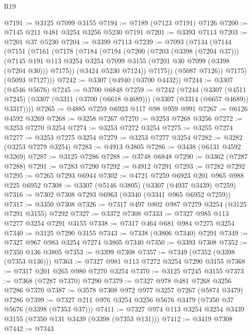 \begin{lexlean}{R19}
\begin{coremodule}
@7191 := @3125 @7099 @3155
@7194 := @7189 (@7123 @7191) @7126
@7200 := @7145 @211 @481 @3254 @3256 @5230 @7191
@7201 := @3393 @7113
@7203 := @7201 @37 @5230
@7204 := @3399 @7113
@7239 := @7093
    (@7134
      (@7144
        (@7151
          (@7161
            (@7178
              (@7184
                (@7194
                  (@7200
                    (@7203 (@3398 (@7204 @37)))
                    (@7145
                      @191
                      @113
                      @3254
                      @3254
                      @7099
                      @3155
                      (@7201 @30 @7099 (@3398 (@7204 @30)))
                      @7175))
                  (@3424 @5230 @7124))
                @7175))
            (@5087 @7126))
          @7175)
        (@5093 @7127)))
@7242 := @3307 (@4940 (@3700 @4432))
@7244 := @3307 (@4546 @5676)
@7245 := @3700 @6848
@7259 := @7242
    (@7244
      (@3307
        (@4511 @7245)
        (@3307 (@3311 (@3700 (@6618 @4689))) (@3307 (@3314 (@6657 @4689)) @3317))))
@7265 := @4885 @7259 @6923 @117 @98 @959 @991
@7267 := @6126 @4592 @3269
@7268 := @3258 @7267
@7270 := @3253 @7268 @3256
@7272 := @3253 @7270 @3254
@7274 := @3253 @7272 @3254
@7275 := @3255 @7274
@7277 := @3253 @7275 @3254
@7279 := @3253 @7277 @3254
@7282 := @3282 (@3253 @7279 @3254)
@7283 := @4913 @3805
@7286 := @3438 (@6131 @4592 @3269)
@7287 := @3125 @7286
@7288 := @3748 @6848
@7290 := @3362 (@7287 @7288)
@7291 := @7283 @7290
@7292 := @4912 @7291
@7293 := @7282 @7292
@7295 := @7265 @7293 @6944
@7302 := @4721 @7259 @6923 @201 @965 @988 @225 @6952
@7308 := @3307 (@5146 @3805) (@3307 (@4937 @3439) @7259)
@7316 := @7302 @7308 @7293 @6963 (@3340 (@3341 @965 @6952 @7259))
@7317 := @3350 @7308
@7326 := @7317 @497 @802 @987 @7279 @3254 (@3125 @7291 @3155) @7292
@7327 := @3372 @7308
@7333 := @7327 @985 @113 @7277 @3254 @7291 @3155
@7338 := @7317 @464 @681 @984 @7275 @3254
@7340 := @3125 @7290 @3155
@7343 := @7338 (@3806 @7340) @7291
@7349 := @7327 @967 @983 @3254 @7274 @3805 @7340
@7350 := @3393 @7308
@7352 := @7350 @136 @3805
@7353 := @3399 @7308
@7357 := @7349 (@7352 (@3398 (@7353 @136)))
@7363 := @7327 @981 @113 @7272 @3254 @7290 @3155
@7368 := @7317 @201 @265 @980 @7270 @3254
@7370 := @3125 @7245 @3155
@7373 := @7368 (@7287 @7370) @7290
@7379 := @7327 @978 @481 @7268 @3256 @7286 @7370
@7387 := @3578 @7308 @972 @977 @3257 @7267 (@5874 @3479) @7286
@7399 := @7327 @211 @976 @3254 @3256 @5676 @3479 (@7350 @37 @5676 (@3398 (@7353 @37)))
@7411 := @7327 @974 @113 @3254 @3254 @3439 @3155 (@7350 @131 @3439 (@3398 (@7353 @131)))
@7412 := @3419 @7308
@7442 := @7343

\end{coremodule}
\end{lexlean}
